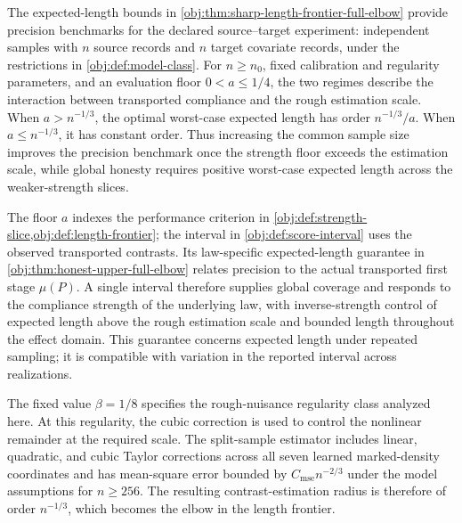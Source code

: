 \documentclass[11pt]{article}
\begin{document}
The expected-length bounds in \cref{obj:thm:sharp-length-frontier-full-elbow} provide precision benchmarks for the declared source--target experiment: independent samples with \(n\) source records and \(n\) target covariate records, under the restrictions in \cref{obj:def:model-class}. For \(n\ge n_0\), fixed calibration and regularity parameters, and an evaluation floor \(0<a\le1/4\), the two regimes describe the interaction between transported compliance and the rough estimation scale. When \(a>n^{-1/3}\), the optimal worst-case expected length has order \(n^{-1/3}/a\). When \(a\le n^{-1/3}\), it has constant order. Thus increasing the common sample size improves the precision benchmark once the strength floor exceeds the estimation scale, while global honesty requires positive worst-case expected length across the weaker-strength slices.

The floor \(a\) indexes the performance criterion in \cref{obj:def:strength-slice,obj:def:length-frontier}; the interval in \cref{obj:def:score-interval} uses the observed transported contrasts. Its law-specific expected-length guarantee in \cref{obj:thm:honest-upper-full-elbow} relates precision to the actual transported first stage \(\mu(P)\). A single interval therefore supplies global coverage and responds to the compliance strength of the underlying law, with inverse-strength control of expected length above the rough estimation scale and bounded length throughout the effect domain. This guarantee concerns expected length under repeated sampling; it is compatible with variation in the reported interval across realizations.

The fixed value \(\beta=1/8\) specifies the rough-nuisance regularity class analyzed here. At this regularity, the cubic correction is used to control the nonlinear remainder at the required scale. The split-sample estimator includes linear, quadratic, and cubic Taylor corrections across all seven learned marked-density coordinates and has mean-square error bounded by \(C_{\mathrm{mse}}n^{-2/3}\) under the model assumptions for \(n\ge256\). The resulting contrast-estimation radius is therefore of order \(n^{-1/3}\), which becomes the elbow in the length frontier.
\end{document}
